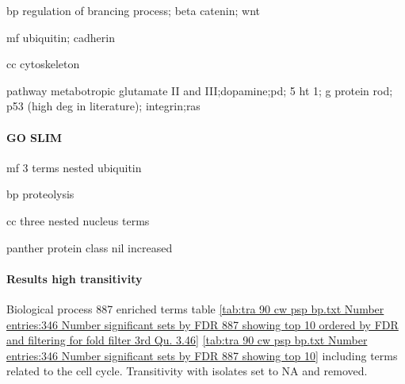 bp regulation of brancing process; beta catenin; wnt

mf ubiquitin; cadherin

cc cytoskeleton

pathway metabotropic glutamate II and III;dopamine;pd; 5 ht 1; g protein rod; p53 (high deg in literature); integrin;ras

\paragraph{GO SLIM}

mf 3 terms nested ubiquitin

bp proteolysis

cc three nested nucleus terms

panther protein class nil increased


\paragraph{Results high transitivity}

Biological process 887 enriched terms table \ref{tab:tra 90 cw psp bp.txt Number entries:346 Number significant sets by FDR 887 showing top 10 ordered by FDR and filtering for fold filter 3rd Qu. 3.46}
\ref{tab:tra 90 cw psp bp.txt Number entries:346 Number significant sets by FDR 887 showing top 10} including terms related to the cell cycle. Transitivity with isolates set to NA and removed.

